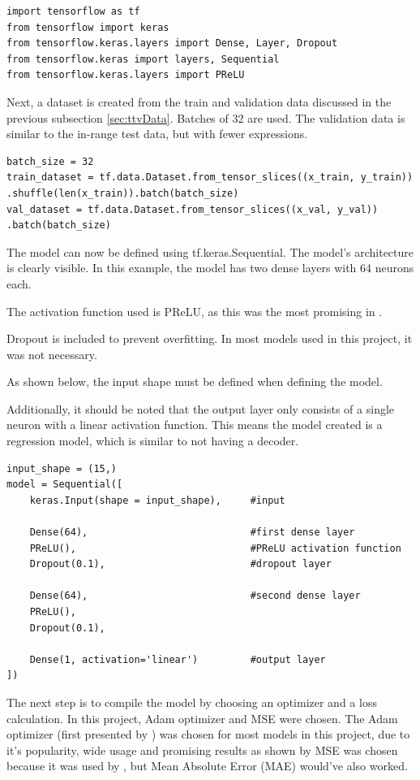 \documentclass{article}
\begin{document}
\begin{Verbatim}
import tensorflow as tf
from tensorflow import keras
from tensorflow.keras.layers import Dense, Layer, Dropout
from tensorflow.keras import layers, Sequential
from tensorflow.keras.layers import PReLU
\end{Verbatim}

Next, a dataset is created from the train and validation data discussed in the previous subsection \ref{sec:ttvData}. Batches of 32 are used. The validation data is similar to the in-range test data, but with fewer expressions.
\begin{Verbatim}
batch_size = 32
train_dataset = tf.data.Dataset.from_tensor_slices((x_train, y_train))
.shuffle(len(x_train)).batch(batch_size)
val_dataset = tf.data.Dataset.from_tensor_slices((x_val, y_val))
.batch(batch_size)
\end{Verbatim}

The model can now be defined using tf.keras.Sequential. The model's architecture is clearly visible. In this example, the model has two dense layers with 64 neurons each.

The activation function used is PReLU, as this was the most promising in \cite{trask2018neuralarithmeticlogicunits}.

Dropout is included to prevent overfitting. In most models used in this project, it was not necessary.

As shown below, the input shape must be defined when defining the model.

Additionally, it should be noted that the output layer only consists of a single neuron with a linear activation function. This means the model created is a regression model, which is similar to not having a decoder.

\begin{Verbatim}
input_shape = (15,)
model = Sequential([
    keras.Input(shape = input_shape),     #input

    Dense(64),                            #first dense layer
    PReLU(),                              #PReLU activation function
    Dropout(0.1),                         #dropout layer

    Dense(64),                            #second dense layer
    PReLU(),                                
    Dropout(0.1),                           

    Dense(1, activation='linear')         #output layer
])
\end{Verbatim}

The next step is to compile the model by choosing an optimizer and a loss calculation. In this project, Adam optimizer and MSE were chosen.
The Adam optimizer (first presented by \cite{kingma2017adammethodstochasticoptimization}) was chosen for most models in this project, due to it's popularity, wide usage and promising results as shown by \cite{ruder2017overviewgradientdescentoptimization}
MSE was chosen because it was used by \cite{trask2018neuralarithmeticlogicunits}, but Mean Absolute Error (MAE) would've also worked.
\end{document}
